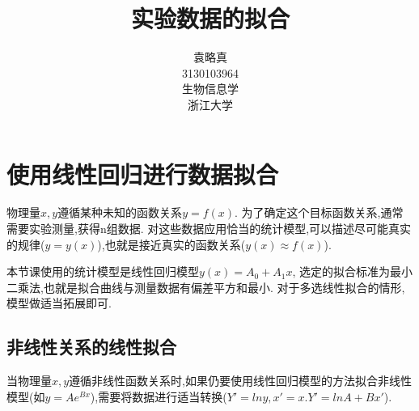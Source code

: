 \documentclass[10pt,a4paper]{article}
\title{实验数据的拟合}
\author{袁略真\\3130103964\\生物信息学\\浙江大学}
\begin{document}
\maketitle

\section{使用线性回归进行数据拟合}
物理量$x,y$遵循某种未知的函数关系$y=f(x)$. 为了确定这个目标函数关系,通常需要实验测量,获得n组数据. 对这些数据应用恰当的统计模型,可以描述尽可能真实的规律($y=y(x)$),也就是接近真实的函数关系($y(x)\approx f(x)$).

本节课使用的统计模型是线性回归模型$y(x)=A_0+A_1x$, 选定的拟合标准为最小二乘法,也就是拟合曲线与测量数据有偏差平方和最小. 对于多选线性拟合的情形,模型做适当拓展即可.

\subsection{非线性关系的线性拟合}
当物理量$x,y$遵循非线性函数关系时,如果仍要使用线性回归模型的方法拟合非线性模型(如$y=Ae^{Bx}$),需要将数据进行适当转换($Y'=lny,x'=x. Y' = lnA + Bx'$).
\end{document}
